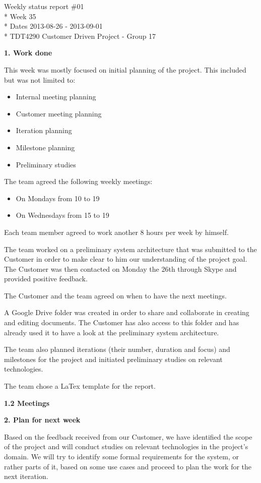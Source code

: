 \begin{center}
Weekly status report \#01\\*
Week 35 \\*
Dates 2013-08-26 - 2013-09-01 \\*
TDT4290 Customer Driven Project - Group 17
\end{center}

\textbf{1. Work done}

This week was mostly focused on initial planning of the project.
This included but was not limited to:
\begin{itemize}
\item Internal meeting planning
\item Customer meeting planning
\item Iteration planning
\item Milestone planning
\item Preliminary studies
\end{itemize}


The team agreed the following weekly meetings:
\begin{itemize}
\item On Mondays from 10 to 19
\item On Wednesdays from 15 to 19
\end{itemize}

Each team member agreed to work another 8 hours per week by himself.

The team worked on a preliminary system architecture that was submitted
to the Customer in order to make clear to him our understanding of the project goal. The Customer was then contacted on Monday the 26th through Skype and provided positive feedback.

The Customer and the team agreed on when to have the next meetings.

A Google Drive folder was created in order to share and collaborate in creating and editing documents. 
The Customer has also access to this folder and has already used it to have a look at the preliminary system architecture.

The team also planned iterations (their number, duration and focus) and milestones for the project and initiated preliminary studies on relevant technologies.

The team chose a LaTex template for the report.


\textbf{1.2 Meetings}

\textbf{2. Plan for next week}

Based on the feedback received from our Customer, we have identified the scope of the project and will conduct studies on relevant technologies in the project’s domain. We will try to identify some formal requirements
for the system, or rather parts of it, based on some use cases and proceed to plan the work for the next iteration.

